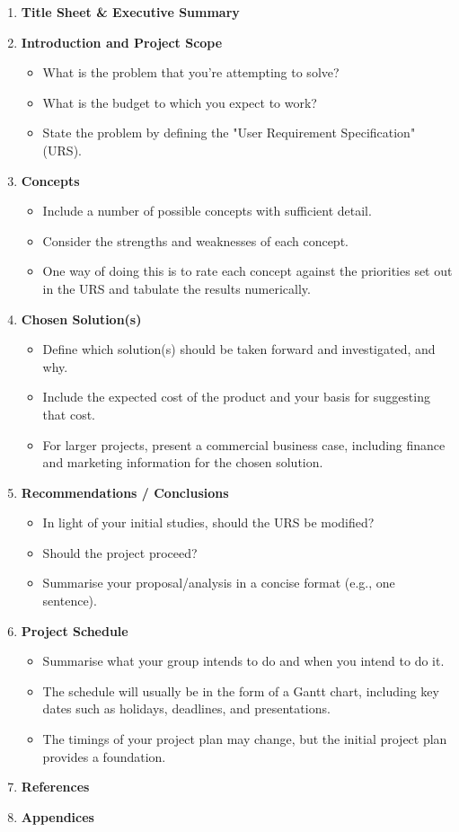 \documentclass[12pt]{article}
\begin{document}
\begin{enumerate}
    \item \textbf{Title Sheet \& Executive Summary}
    \item \textbf{Introduction and Project Scope}
    \begin{itemize}
        \item What is the problem that you’re attempting to solve?
        \item What is the budget to which you expect to work?
        \item State the problem by defining the "User Requirement Specification" (URS).
    \end{itemize}
    \item \textbf{Concepts}
    \begin{itemize}
        \item Include a number of possible concepts with sufficient detail.
        \item Consider the strengths and weaknesses of each concept.
        \item One way of doing this is to rate each concept against the priorities set out in the URS and tabulate the results numerically.
    \end{itemize}
    \item \textbf{Chosen Solution(s)}
    \begin{itemize}
        \item Define which solution(s) should be taken forward and investigated, and why.
        \item Include the expected cost of the product and your basis for suggesting that cost.
        \item For larger projects, present a commercial business case, including finance and marketing information for the chosen solution.
    \end{itemize}
    \item \textbf{Recommendations / Conclusions}
    \begin{itemize}
        \item In light of your initial studies, should the URS be modified?
        \item Should the project proceed?
        \item Summarise your proposal/analysis in a concise format (e.g., one sentence).
    \end{itemize}
    \item \textbf{Project Schedule}
    \begin{itemize}
        \item Summarise what your group intends to do and when you intend to do it.
        \item The schedule will usually be in the form of a Gantt chart, including key dates such as holidays, deadlines, and presentations.
        \item The timings of your project plan may change, but the initial project plan provides a foundation.
    \end{itemize}
    \item \textbf{References}
    \item \textbf{Appendices}
\end{enumerate}
\end{document}

